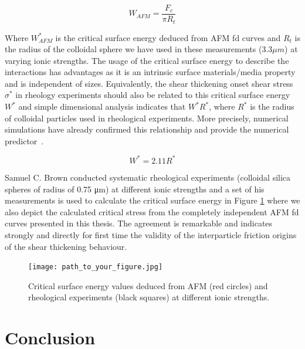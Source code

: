 \[ W_{AFM} = \frac{F_c}{\pi R_t} \]

Where $W^*_{AFM}$ is the critical surface energy deduced from AFM fd curves and $R_t$ is the radius of the colloidal sphere we have used in these measurements ($3.3 \mu m$) at varying ionic strengths. The usage of the critical surface energy to describe the interactions has advantages as it is an intrinsic surface materials/media property and is independent of sizes. Equivalently, the shear thickening onset shear stress $\sigma^*$ in rheology experiments should also be related to this critical surface energy $W^*$ and simple dimensional analysis indicates that $W^* R^*$, where $R^*$ is the radius of colloidal particles used in rheological experiments. More precisely, numerical simulations have already confirmed this relationship and provide the numerical predictor~\cite{reference4}.

\[ W^* = 2.11 R^* \]

Samuel C. Brown conducted systematic rheological experiments (colloidal silica spheres of radius of 0.75 μm) at different ionic strengths and a set of his measurements is used to calculate the critical surface energy in Figure \ref{fig:critical_surface_energy} where we also depict the calculated critical stress from the completely independent AFM fd curves presented in this thesis. The agreement is remarkable and indicates strongly and directly for first time the validity of the interparticle friction origins of the shear thickening behaviour.

\begin{figure}[H]
\centering
\texttt{[image: path\_to\_your\_figure.jpg]}
\caption{Critical surface energy values deduced from AFM (red circles) and rheological experiments (black squares) at different ionic strengths.}
\label{fig:critical_surface_energy}
\end{figure}

\newpage
\newpage

\chapter{Conclusion}

